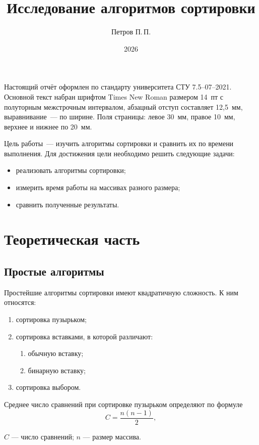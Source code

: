 \documentclass{sfureport}
\institute{Институт космических и информационных технологий}
\title{Исследование алгоритмов сортировки}
\author{Петров П.\,П.}
\date{2026}
\begin{document}
\maketitle



Настоящий отчёт оформлен по стандарту университета СТУ 7.5–07–2021. Основной текст набран шрифтом Times New Roman размером 14~пт с полуторным межстрочным интервалом, абзацный отступ составляет 12,5~мм, выравнивание~--- по ширине. Поля страницы: левое 30~мм, правое 10~мм, верхнее и нижнее по 20~мм.

Цель работы~--- изучить алгоритмы сортировки и сравнить их по времени выполнения. Для достижения цели необходимо решить следующие задачи:
\begin{itemize}
  \item реализовать алгоритмы сортировки;
  \item измерить время работы на массивах разного размера;
  \item сравнить полученные результаты.
\end{itemize}

\section{Теоретическая часть}

\subsection{Простые алгоритмы}

Простейшие алгоритмы сортировки имеют квадратичную сложность. К ним относятся:
\begin{enumerate}
  \item сортировка пузырьком;
  \item сортировка вставками, в которой различают:
    \begin{enumerate}
      \item обычную вставку;
      \item бинарную вставку;
    \end{enumerate}
  \item сортировка выбором.
\end{enumerate}

Среднее число сравнений при сортировке пузырьком определяют по формуле
\begin{equation}
  C = \frac{n(n-1)}{2},
  \label{eq:cmp}
\end{equation}
\begin{gde}
  $C$ --- число сравнений;
  \gdeitem $n$ --- размер массива.
\end{gde}
\end{document}
